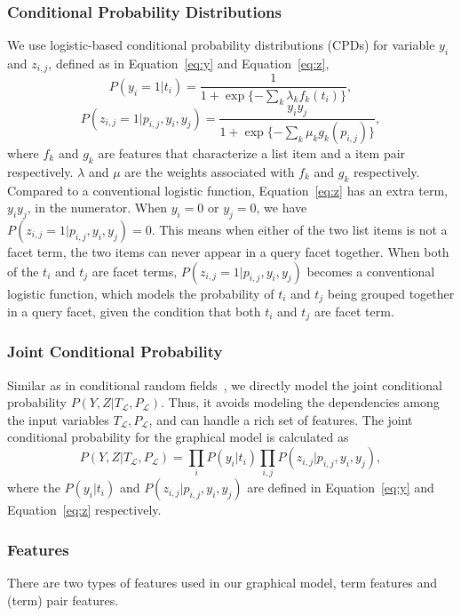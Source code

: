 \subsubsection{Conditional Probability Distributions}
We use logistic-based conditional probability distributions (CPDs) for variable $y_i$ and $z_{i,j}$, defined as in Equation~\ref{eq:y} and Equation~\ref{eq:z},
\begin{equation}
\label{eq:y}
P(y_i = 1|t_i)=\frac{1}{1+\exp\{-\sum_k{\lambda_k f_k(t_i)}\}},
\end{equation}
\begin{equation}
\label{eq:z}
P(z_{i,j} = 1|p_{i,j},y_i, y_j)=\frac{y_i y_j}{1+\exp\{-\sum_k{\mu_k g_k(p_{i,j})}\}},
\end{equation}
where $f_k$ and $g_k$ are features that characterize a list item and a item pair respectively. $\lambda$ and $\mu$ are the weights associated with $f_k$ and $g_k$ respectively. Compared to a conventional logistic function, Equation~\ref{eq:z} has an extra term, $y_iy_j$, in the numerator. When $y_i=0$ or $y_j=0$, we have $P(z_{i,j}=1|p_{i,j},y_i,y_j)=0$. This means when either of the two list items is not a facet term, the two items can never appear in a query facet together.
When both of the $t_i$ and $t_j$ are facet terms, $P(z_{i,j}=1|p_{i,j},y_i,y_j)$ becomes a conventional logistic function, which models the probability of $t_i$ and $t_j$ being grouped together in a query facet, given the condition that both $t_i$ and $t_j$ are facet term.

\subsubsection{Joint Conditional Probability}
Similar as in conditional random fields~\cite{lafferty2001conditional}, we directly model the joint conditional probability $P(Y,Z|T_{\mathcal{L}},P_{\mathcal{L}})$. Thus, it avoids modeling the dependencies among the input variables $T_{\mathcal{L}},P_{\mathcal{L}}$, and can handle a rich set of features. The joint conditional probability for the graphical model is calculated as
\begin{equation}
\label{eq:joint}
P(Y,Z|T_{\mathcal{L}},P_{\mathcal{L}}) = \prod_{i}{P(y_i|t_i)}\prod_{i,j}{P(z_{i,j}|p_{i,j},y_i, y_j)},
\end{equation}
where the $P(y_i|t_i)$ and $P(z_{i,j}|p_{i,j}, y_i, y_j)$ are defined in Equation~\ref{eq:y} and Equation~\ref{eq:z} respectively.

\subsubsection{Features}
\label{sec:facet-features}
There are two types of features used in our graphical model, term features and (term) pair features. 

